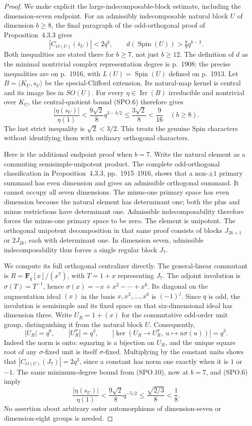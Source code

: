 \begin{proof}
We make explicit the large-indecomposable-block estimate, including
the dimension-seven endpoint.  For an admissibly indecomposable
natural block $U$ of dimension $b\ge8$, the final paragraph of the
odd-orthogonal proof of Proposition~4.3.3 gives
\[
 |C_{O(U)}(\bar s_U)|<2q^b,\qquad
 d(\operatorname{Spin}(U))>\tfrac89q^{b-3}.
 \tag{SPO.10}
\]
Both inequalities are stated there for $b\ge7$, not just $b\ge12$.
The definition of $d$ as the minimal nontrivial complex
representation degree is p.~1908; the precise inequalities are
on p.~1916, with $L(U)=\operatorname{Spin}(U)$ defined on p.~1913.
Let $B=\langle K_U,s_U\rangle$ be the special-Clifford extension.
Its natural-map kernel is central and its image lies in $SO(U)$.
For every $\eta\in\operatorname{Irr}(B)$ irreducible and nontrivial
over $K_U$, the central-quotient bound (SPO.6) therefore gives
\[
 \frac{|\eta(s_U)|}{\eta(1)}
 <\frac{9\sqrt2}{8}q^{3-b/2}
 \le\frac{3\sqrt2}{8}<\frac9{16}\quad(b\ge8).
 \tag{SPO.11}
\]
The last strict inequality is $\sqrt2<3/2$.
This treats the genuine Spin characters without identifying them
with ordinary orthogonal characters.

Here is the additional endpoint proof when $b=7$.
Write the natural element as a commuting semisimple-unipotent
product.  The complete odd-orthogonal classification in
Proposition~4.3.3, pp.~1915--1916, shows that a non-$\pm1$
primary summand has even dimension and gives an admissible
orthogonal summand.  It cannot occupy all seven dimensions.
The minus-one primary space has even dimension because the
natural element has determinant one; both the plus and minus
restrictions have determinant one.  Admissible indecomposability
therefore forces the minus-one primary space to be zero.
The element is unipotent.  The orthogonal unipotent decomposition
in that same proof consists of blocks $J_{2k+1}$ or $2J_{2k}$,
each with determinant one.  In dimension seven, admissible
indecomposability thus forces a single regular block $J_7$.

We compute its full orthogonal centralizer directly.
The general-linear commutant is
$R=\mathbf F_q[x]/(x^7)$, with $T=1+x$ representing $J_7$.
The adjoint involution is $\sigma(T)=T^{-1}$, hence
$\sigma(x)=-x+x^2-\cdots+x^6$.
Its diagonal on the augmentation ideal $(x)$ in the basis
$x,x^2,\ldots,x^6$ is $(-1)^j$.
Since $q$ is odd, the involution is semisimple and its fixed
space on that six-dimensional ideal has dimension three.
Write $U_R=1+(x)$ for the commutative odd-order unit group,
distinguishing it from the natural block $U$.  Consequently,
\[
 |U_R|=q^6,\qquad |U_R^\sigma|=q^3,\qquad
 |\ker(U_R\longrightarrow U_R^\sigma,\ u\mapsto u\sigma(u))|=q^3.
 \tag{SPO.11a}
\]
Indeed the norm is onto: squaring is a bijection on $U_R$, and
the unique square root of any $\sigma$-fixed unit is itself
$\sigma$-fixed.  Multiplying by the constant units shows that
$|C_{O(U)}(J_7)|=2q^3$, since a constant has norm one exactly
when it is $1$ or $-1$.
The same minimum-degree bound from (SPO.10), now at $b=7$,
and (SPO.6) imply
\[
 \frac{|\eta(s_U)|}{\eta(1)}
 <\frac{9\sqrt2}{8}q^{-5/2}
 \le\frac{\sqrt{2/3}}8<\frac18.
 \tag{SPO.11b}
\]
No assertion about arbitrary outer automorphisms of dimension-seven
or dimension-eight groups is needed.


\end{proof}
